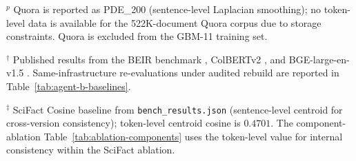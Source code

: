 \documentclass[review,1p]{elsarticle}
\begin{document}
\begin{table}[ht]
{$^p$ Quora is reported as PDE\_200 (sentence-level Laplacian smoothing); no token-level data is available for the 522K-document Quora corpus due to storage constraints. Quora is excluded from the GBM-11 training set.

$^\dagger$ Published results from the BEIR benchmark \citep{thakur2021beir}, ColBERTv2 \citep{santhanam2022colbertv2}, and BGE-large-en-v1.5 \citep{xiao2023bge}. Same-infrastructure re-evaluations under audited rebuild are reported in Table~\ref{tab:agent-b-baselines}.

$^{\ddagger}$ SciFact Cosine baseline from \texttt{bench\_results.json} (sentence-level centroid for cross-version consistency); token-level centroid cosine is $0.4701$. The component-ablation Table~\ref{tab:ablation-components} uses the token-level value for internal consistency within the SciFact ablation.
}
\end{table}
\end{document}
